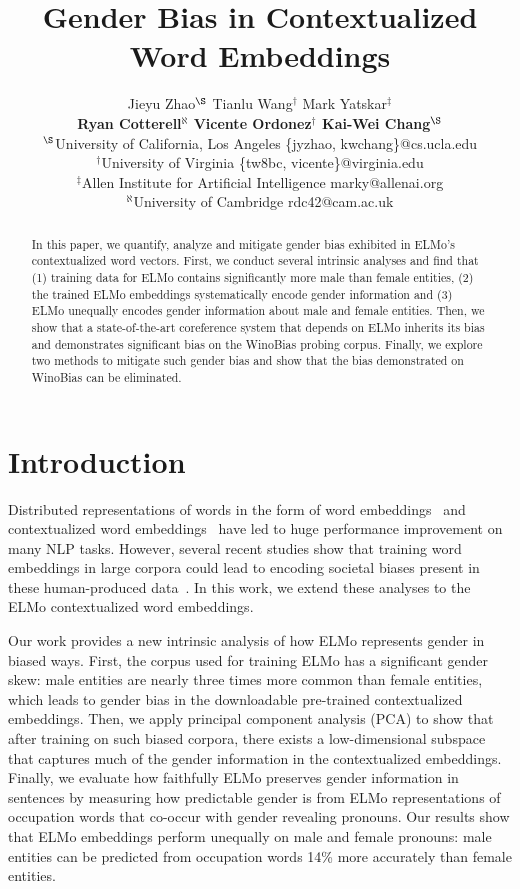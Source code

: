 \documentclass[11pt,a4paper]{article}
\title{Gender Bias in Contextualized Word Embeddings}
\author{Jieyu Zhao$^\S$ \qquad
 Tianlu Wang$^\dagger$ \qquad
  Mark Yatskar$^\ddag$   \\
{\bf Ryan Cotterell$^\aleph$ \qquad Vicente Ordonez$^\dagger$ \qquad
 Kai-Wei Chang$^\S$}
\\
  $^\S$University of California, Los Angeles \qquad
  \{jyzhao, kwchang\}@cs.ucla.edu \\
  $^\dagger$University of Virginia \qquad
  \{tw8bc, vicente\}@virginia.edu
  \\ $^\ddag$Allen Institute for Artificial Intelligence \qquad marky@allenai.org
  \\ $^\aleph$University of Cambridge \qquad rdc42@cam.ac.uk
}
\date{}
\begin{document}
\maketitle
%
\begin{abstract}
 In this paper, we quantify, analyze and mitigate gender bias exhibited in ELMo's contextualized word vectors.
 First, we conduct several intrinsic analyses and find that (1) training data for ELMo contains significantly more male than female entities, (2) the trained ELMo embeddings systematically encode gender information and (3) ELMo unequally encodes gender information about male and female entities.
 Then, we show that a state-of-the-art coreference system that depends on ELMo inherits its bias and demonstrates significant bias on the WinoBias probing corpus.
 Finally, we explore two methods to mitigate such gender bias and show that the bias demonstrated on WinoBias can be eliminated.


\end{abstract}


\section{Introduction}
\label{sec:introduction}
Distributed representations of words in the form of word embeddings~\cite{mikolov2013distributed,pennington2014glove} and contextualized word embeddings~\cite{Peters:2018,devlin2018bert,radford2018improving,mccann2017learned,radford2019language} have led to huge performance improvement on many NLP tasks.
However, several recent studies show that training word embeddings in large corpora could lead to encoding societal biases present in these human-produced data~\cite{BCWS16,caliskan2017semantics}. In this work, we extend these analyses to the ELMo contextualized word embeddings.

Our work provides a new intrinsic analysis of how ELMo represents gender in biased ways.
First, the corpus used for training ELMo has a significant gender skew: male entities are nearly three times more common than female entities, which leads to gender bias in the downloadable pre-trained contextualized embeddings.
Then, we apply principal component analysis (PCA) to show that after training on such biased corpora, there exists a low-dimensional subspace that captures much of the gender information in the contextualized embeddings.
Finally, we evaluate how faithfully ELMo preserves gender information in sentences by measuring how predictable gender is from ELMo representations of occupation words that co-occur with gender revealing pronouns.
Our results show that ELMo embeddings perform unequally on male and female pronouns: male entities can be predicted from occupation words 14\% more accurately than female entities.
\end{document}
